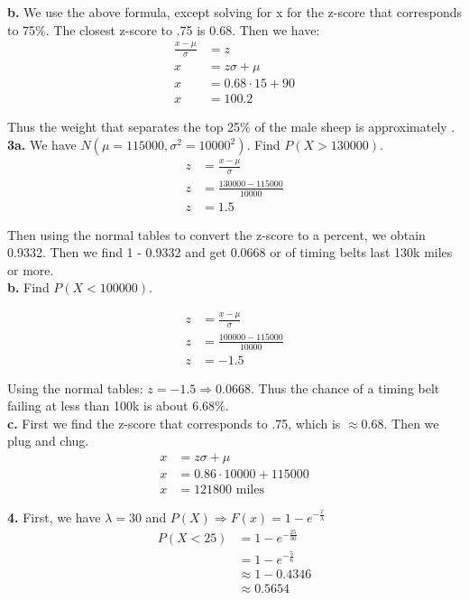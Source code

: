 \documentclass[12pt]{report}
\begin{document}
\noindent \textbf{b.} We use the above formula, except solving for x for the z-score that corresponds to 75\%. The closest z-score to .75 is 0.68. Then we have:
\begin{align*}
\frac{x-\mu}{\sigma} &= z\\
x &= z\sigma + \mu\\
x &= 0.68 \cdot 15 + 90\\
x &= 100.2
\end{align*}

\noindent Thus the weight that separates the top 25\% of the male sheep is approximately .\\

\noindent \textbf{3a.} We have $N(\mu = 115000, \sigma^2 = 10000^2)$. Find $P(X > 130000)$. \\
\begin{align*}
z &= \frac{x - \mu}{\sigma}\\
z &= \frac{130000 - 115000}{10000}\\
z &= 1.5
\end{align*}

\noindent Then using the normal tables to convert the z-score to a percent, we obtain 0.9332. Then we find 1 - 0.9332 and get 0.0668 or  of timing belts last 130k miles or more.\\

\noindent \textbf{b.} Find $P(X < 100000)$.

\begin{align*}
z &= \frac{x-\mu}{\sigma}\\
z &= \frac{100000 - 115000}{10000}\\
z &= -1.5
\end{align*}

\noindent Using the normal tables: $z = -1.5 \Rightarrow 0.0668$. Thus the chance of a timing belt failing at less than 100k is about 6.68\%.\\

\noindent \textbf{c.} First we find the z-score that corresponds to .75, which is $\approx 0.68$. Then we plug and chug.
\begin{align*}
x &= z\sigma + \mu\\
x &= 0.86 \cdot 10000 + 115000\\
x &= \boxed{121800 \text{ miles}}
\end{align*}

\noindent \textbf{4.} First, we have $\lambda = 30$ and $P(X) \Rightarrow F(x) = 1- e^{-\frac{x}{\lambda}}$
\begin{align*}
P(X < 25) &= 1-e^{-\frac{25}{30}}\\
&= 1-e^{-\frac{5}{6}}\\
&\approx 1-0.4346\\
&\boxed{\approx 0.5654}
\end{align*}
\end{document}
